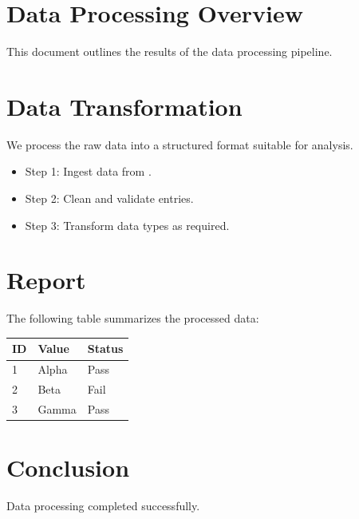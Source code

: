 \documentclass{article}
\begin{document}
\title{\ReportTitle}
\author{\Author}
\date{} %

\maketitle

\section{Data Processing Overview}

This document outlines the results of the data processing pipeline.

\section{Data Transformation}

We process the raw data into a structured format suitable for analysis.

\begin{itemize}
    \item Step 1: Ingest data from \DataSrc.
    \item Step 2: Clean and validate entries.
    \item Step 3: Transform data types as required.
\end{itemize}

\section{Report}

The following table summarizes the processed data:

\begin{center}
    \begin{tabular}{lll}
        \toprule
        ID & Value & Status \\
        \midrule
        1 & Alpha & Pass \\
        2 & Beta & Fail \\
        3 & Gamma & Pass \\
        \bottomrule
    \end{tabular}
\end{center}

\section{Conclusion}

Data processing completed successfully.
\end{document}
